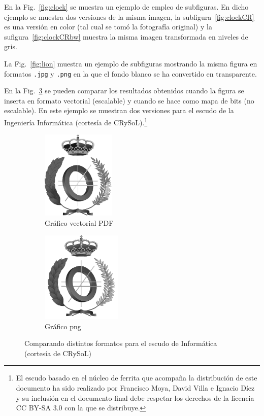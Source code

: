 \documentclass[11pt,a4paper]{article}
\begin{document}
En la Fig.~\ref{fig:clock} se muestra un ejemplo de empleo de subfiguras. En dicho ejemplo se muestra dos versiones de la misma imagen, la subfigura~\ref{fig:clockCR} es una versión en color (tal cual se tomó la fotografía original) y la sufigura~\ref{fig:clockCRbw} muestra la misma imagen transformada en niveles de gris.

La Fig.~\ref{fig:lion} muestra un ejemplo de subfiguras mostrando la misma figura en formatos \texttt{.jpg} y \texttt{.png} en la que el fondo blanco se ha convertido en transparente. 

En la Fig.~\ref{fig:escudo} se pueden comparar los resultados obtenidos cuando la figura se inserta en formato vectorial (escalable) y cuando se hace como mapa de bits (no escalable). En este ejemplo se muestran dos versiones para el escudo de la Ingeniería Informática (cortesía de CRySoL).\footnote{El escudo basado en el núcleo de ferrita que acompaña la distribución de este documento ha sido realizado por Francisco Moya, David Villa e Ignacio Díez y su inclusión en el documento final debe respetar los derechos de la licencia CC BY-SA 3.0 con la que se distribuye.}


\begin{figure}[hbt]
	\centering
	\begin{subfigure}[b]{0.4\linewidth}
		\centering
		\includegraphics[width=3.5cm]{escudoInfBW.pdf}
		\caption{Gráfico vectorial PDF}\label{fig:escudoPDF}
	\end{subfigure}
	\begin{subfigure}[b]{0.4\linewidth}
		\centering
		\includegraphics[width=3.8cm]{escudoInfBW.png}
		\caption{Gráfico png}\label{fig:escudoPNG}
	\end{subfigure}
	\caption[Comparación PDF y png]{Comparando distintos formatos para el escudo de Informática (cortesía de CRySoL)}
	\label{fig:escudo}
\end{figure}
\end{document}

